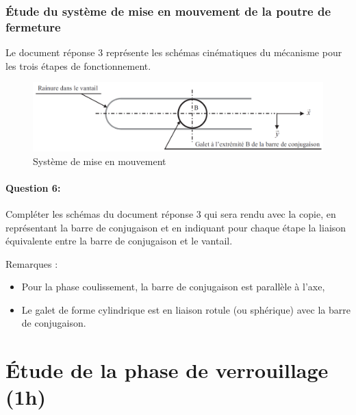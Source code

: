 \subsubsection{Étude du système de mise en mouvement de la poutre de fermeture}

Le document réponse 3 représente les schémas cinématiques du mécanisme pour les trois étapes de fonctionnement.

\begin{figure}[!h]
 \centering\includegraphics[width=0.8\linewidth]{img/Portes12.png}
 \caption{Système de mise en mouvement}
 \label{fig11}
\end{figure}

\paragraph{Question 6:} Compléter les schémas du document réponse 3 qui sera rendu avec la copie, en représentant la barre de conjugaison et en indiquant pour chaque étape la liaison équivalente entre la barre de conjugaison et le vantail.

Remarques :
\begin{itemize}
 \item Pour la phase coulissement, la barre de conjugaison est parallèle à l'axe,
 \item Le galet de forme cylindrique est en liaison rotule (ou sphérique) avec la barre de conjugaison.
\end{itemize}

\section{Étude de la phase de verrouillage (1h)}

